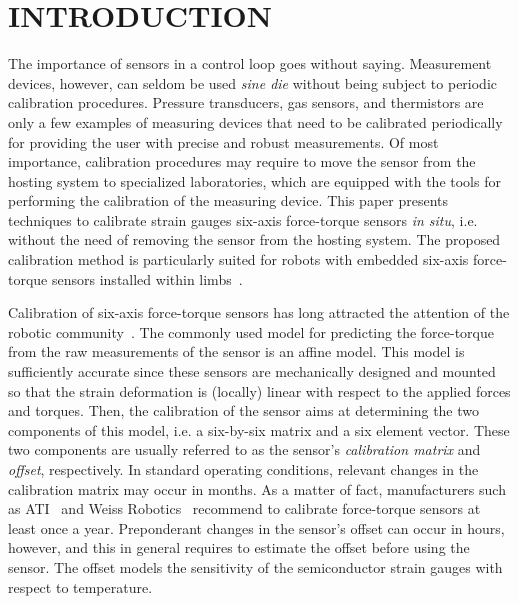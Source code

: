 \section{INTRODUCTION}
The importance of sensors in a control loop goes without saying.
Measurement devices, however, can seldom be used \emph{sine die} without being subject to periodic calibration procedures.
Pressure transducers, gas sensors, and thermistors are only a few examples of measuring devices that need to be calibrated periodically for providing 
the user with precise and robust measurements.
Of most importance, calibration procedures may require to move the sensor from the hosting system to specialized laboratories, which are equipped with
the tools for performing the calibration of the measuring device. This paper presents techniques to calibrate 
strain gauges six-axis force-torque sensors \emph{in situ}, i.e. without the need of removing the sensor from the hosting system.
The proposed calibration method is particularly suited for robots with embedded six-axis force-torque sensors installed within limbs~\cite{Fumagalli2012}. 

Calibration of six-axis force-torque sensors  has long attracted the attention of the robotic community~\cite{braun2011}. 
The commonly used model for predicting the force-torque 
from the raw measurements of the sensor is an affine model.
This model is sufficiently accurate 
since these sensors are mechanically designed and mounted so that the strain deformation is (locally) linear with respect to the applied forces and torques.
Then, the calibration of the sensor aims at determining the two components of this model, i.e. a six-by-six matrix and a six element vector.
These two components are usually referred to as the sensor's \emph{calibration matrix} and \emph{offset}, respectively.
In standard operating conditions, relevant changes in the calibration matrix may occur in months.
As a matter of fact, manufacturers such as ATI~\cite{atimanual} and Weiss Robotics~\cite{kms40manual} 
recommend to calibrate force-torque sensors at least once a year.
Preponderant changes in the sensor's offset can occur in hours, however, and this in general requires to estimate the 
offset before using the  sensor.
The offset models the sensitivity of the semiconductor strain gauges with respect to temperature.

